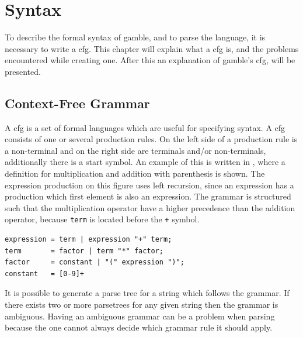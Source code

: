 \chapter{Syntax}\label{chap:syntax}

To describe the formal syntax of \gls{gamble}, and to parse the language, it is necessary to write a \acrfull{cfg}.
This chapter will explain what a \acrshort{cfg} is, and the problems encountered while creating one.
After this an explanation of \gls{gamble}'s \acrshort{cfg}, will be presented.

\section{Context-Free Grammar}\label{sec:cfg}
A \acrshort{cfg} is a set of formal languages which are useful for specifying syntax. 
A \acrshort{cfg} consists of one or several production rules.
On the left side of a production rule is a non-terminal and on the right side are terminals and/or non-terminals, additionally there is a start symbol.
An example of this is written in , where a definition for multiplication and addition with parenthesis is shown.
The expression production on this figure uses left recursion, since an expression has a production which first element is also an expression.
The grammar is structured such that the multiplication operator have a higher precedence than the addition operator, because \texttt{term} is located before the \texttt{+} symbol.

\begin{lstlisting}[caption={An example of a \acrshort{cfg} written in \acrshort{ebnf}, with \acrshort{regex} for defining numbers. },frame=tlrb,label={lst:cfglst1},numbers=none]
expression = term | expression "+" term;
term       = factor | term "*" factor;
factor     = constant | "(" expression ")";
constant   = [0-9]+
\end{lstlisting}

It is possible to generate a parse tree for a string which follows the grammar. 
If there exists two or more parsetrees for any given string then the grammar is ambiguous. 
Having an ambiguous grammar can be a problem when parsing because the one cannot always decide which grammar rule it should apply.

